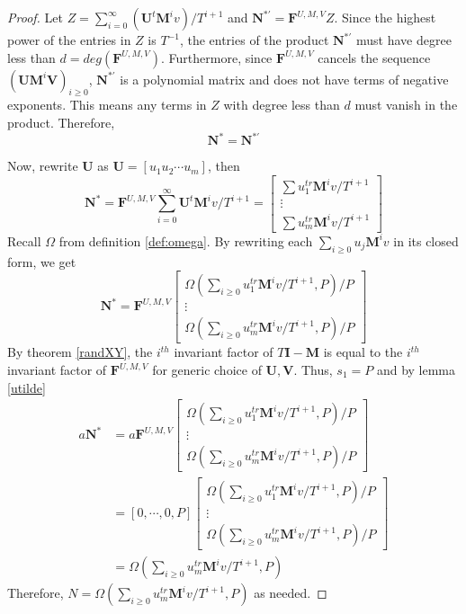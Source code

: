 \documentclass[12pt]{article}
\def\mF{\mathbf{F}}
\def\mI{\mathbf{I}}
\def\mM{\mathbf{M}}
\def\mN{\mathbf{N}}
\def\mU{\mathbf{U}}
\def\mV{\mathbf{V}}
\begin{document}
\begin{proof}
	Let $Z = \sum_{i=0}^{\infty} (\mU^t\mM^iv)/T^{i+1}$ and
	$\mN^{*'} = \mF^{U,M,V} Z$.
	Since the highest power of the entries in 
	$Z$ is $T^{-1}$, the 
	entries of the product $\mN^{*'}$ must have degree less 
	than $d = deg(\mF^{U,M,V})$. Furthermore, since $\mF^{U,M,V}$ cancels 
	the sequence $(\mU\mM^i\mV)_{i \ge 0}$, $\mN^{*'}$ is a
	polynomial matrix and does not have terms of negative exponents.
	This means any terms in $Z$ with degree less than $d$ must vanish in the
	product.
	Therefore,
	$$ \mN^* = \mN^{*'}$$
	
	Now, rewrite $\mU$ as $\mU = [u_1 u_2 \cdots u_m]$, then
	$$
	\mN^* = \mF^{U,M,V}
	\sum_{i=0}^{\infty} \mU^t \mM^i v / T^{i+1} =
	\begin{bmatrix}
	\sum u_1^{tr}\mM^iv/T^{i+1}\\
	\vdots                   \\
	\sum u_m^{tr}\mM^iv/T^{i+1}
	\end{bmatrix}$$
	Recall $\Omega$ from definition \ref{def:omega}.
	By rewriting each $\sum_{i\ge0} u_j \mM^i v$ in its closed form, we get
	$$ \mN^* = \mF^{U,M,V}
	\begin{bmatrix}
	\Omega(\sum_{i\ge0} u_1^{tr} \mM^i v/T^{i+1},P) / P \\
	\vdots      \\
	\Omega(\sum_{i\ge0} u_m^{tr} \mM^i v/T^{i+1},P) / P 
	\end{bmatrix}
	$$
	By theorem \ref{randXY}, the $i^{th}$ invariant factor of
	$T\mI - \mM$ is equal to the $i^{th}$ invariant factor of $\mF^{U,M,V}$ 
	for generic choice of
	$\mU,\mV$. Thus, $s_1 = P$ and by lemma \ref{utilde}
	\begin{align*}
	a \mN^* &= a \mF^{U,M,V}
	\begin{bmatrix}
	\Omega(\sum_{i\ge0} u_1^{tr} \mM^i v/T^{i+1},P) / P \\
	\vdots      \\
	\Omega(\sum_{i\ge0} u_m^{tr} \mM^i v/T^{i+1},P) / P 
	\end{bmatrix}\\
	&= [0,\cdots,0,P]
	\begin{bmatrix}
	\Omega(\sum_{i\ge0} u_1^{tr} \mM^i v/T^{i+1},P) / P \\
	\vdots      \\
	\Omega(\sum_{i\ge0} u_m^{tr} \mM^i v/T^{i+1},P) / P 
	\end{bmatrix}\\
	&= \Omega(\sum_{i\ge0} u_m^{tr} \mM^i v/T^{i+1},P)
	\end{align*}
	Therefore, $N = \Omega(\sum_{i\ge0} u_m^{tr} \mM^i v/T^{i+1},P)$ as needed.
\end{proof}
\end{document}
